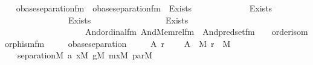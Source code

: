 \begin{isabellebody}
\endisatagproof
{\isafoldproof}%
%
\isadelimproof
\ \isanewline
%
\endisadelimproof
\isanewline
{}\isamarkupfalse%
\ obase{\isacharunderscore}{\kern0pt}separation{\isacharunderscore}{\kern0pt}fm\ \ {\isachardoublequoteopen}obase{\isacharunderscore}{\kern0pt}separation{\isacharunderscore}{\kern0pt}fm\ {\isasymequiv}\ Exists\isanewline
\ \ \ \ \ \ \ \ \ \ \ \ \ {\isacharparenleft}{\kern0pt}Exists\isanewline
\ \ \ \ \ \ \ \ \ \ \ \ \ \ \ {\isacharparenleft}{\kern0pt}Exists\isanewline
\ \ \ \ \ \ \ \ \ \ \ \ \ \ \ \ \ {\isacharparenleft}{\kern0pt}Exists\isanewline
\ \ \ \ \ \ \ \ \ \ \ \ \ \ \ \ \ \ \ {\isacharparenleft}{\kern0pt}And{\isacharparenleft}{\kern0pt}ordinal{\isacharunderscore}{\kern0pt}fm{\isacharparenleft}{\kern0pt}{}{\isacharparenright}{\kern0pt}{\isacharcomma}{\kern0pt}\ And{\isacharparenleft}{\kern0pt}Memrel{\isacharunderscore}{\kern0pt}fm{\isacharparenleft}{\kern0pt}{}{\isacharcomma}{\kern0pt}\ {}{\isacharparenright}{\kern0pt}{\isacharcomma}{\kern0pt}\ And{\isacharparenleft}{\kern0pt}pred{\isacharunderscore}{\kern0pt}set{\isacharunderscore}{\kern0pt}fm{\isacharparenleft}{\kern0pt}{}{\isacharcomma}{\kern0pt}\ {}{\isacharcomma}{\kern0pt}\ {}{\isacharcomma}{\kern0pt}\ {}{\isacharparenright}{\kern0pt}{\isacharcomma}{\kern0pt}\ order{\isacharunderscore}{\kern0pt}isomorphism{\isacharunderscore}{\kern0pt}fm{\isacharparenleft}{\kern0pt}{}{\isacharcomma}{\kern0pt}\ {}{\isacharcomma}{\kern0pt}\ {}{\isacharcomma}{\kern0pt}\ {}{\isacharcomma}{\kern0pt}\ {}{\isacharparenright}{\kern0pt}{\isacharparenright}{\kern0pt}{\isacharparenright}{\kern0pt}{\isacharparenright}{\kern0pt}{\isacharparenright}{\kern0pt}{\isacharparenright}{\kern0pt}{\isacharparenright}{\kern0pt}{\isacharparenright}{\kern0pt}{\isachardoublequoteclose}\isanewline
\isanewline
{}\isamarkupfalse%
\ obase{\isacharunderscore}{\kern0pt}separation\ {\isacharcolon}{\kern0pt}\ \isanewline
\ \ \ A\ r\ \isanewline
\ \ \ {\isachardoublequoteopen}A\ {\isasymin}\ M{\isachardoublequoteclose}\ {\isachardoublequoteopen}r\ {\isasymin}\ M{\isachardoublequoteclose}\ \isanewline
\ \ \ {\isachardoublequoteopen}separation{\isacharparenleft}{\kern0pt}{\isacharhash}{\kern0pt}{\isacharhash}{\kern0pt}M{\isacharcomma}{\kern0pt}\ {\isasymlambda}a{\isachardot}{\kern0pt}\ {\isasymexists}x{\isacharbrackleft}{\kern0pt}{\isacharhash}{\kern0pt}{\isacharhash}{\kern0pt}M{\isacharbrackright}{\kern0pt}{\isachardot}{\kern0pt}\ {\isasymexists}g{\isacharbrackleft}{\kern0pt}{\isacharhash}{\kern0pt}{\isacharhash}{\kern0pt}M{\isacharbrackright}{\kern0pt}{\isachardot}{\kern0pt}\ {\isasymexists}mx{\isacharbrackleft}{\kern0pt}{\isacharhash}{\kern0pt}{\isacharhash}{\kern0pt}M{\isacharbrackright}{\kern0pt}{\isachardot}{\kern0pt}\ {\isasymexists}par{\isacharbrackleft}{\kern0pt}{\isacharhash}{\kern0pt}{\isacharhash}{\kern0pt}M{\isacharbrackright}{\kern0pt}{\isachardot}{\kern0pt}\isanewline

\end{isabellebody}
